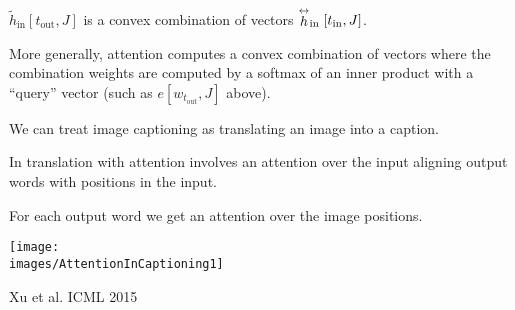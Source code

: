 {\vfill
$\tilde{h}_\mathrm{in}[t_\mathrm{out},J]$ is a convex combination of vectors $\stackrel{\leftrightarrow}{h}_{\mathrm{in}}[t_{\mathrm{in}},J]$.

\vfill
More generally, attention computes a convex combination of vectors where the combination weights are computed by a softmax of an inner product with a ``query'' vector (such as $e[w_{t_{\mathrm{out}}},J]$ above).

We can treat image captioning as translating an image into a caption.

\vfill
In translation with attention involves an attention over the input aligning output words with positions in the input.

\vfill
For each output word we get an attention over the image positions.


\centerline{\texttt{[image: \\images/AttentionInCaptioning1]}}
\centerline{\Large Xu et al. ICML 2015}

}

